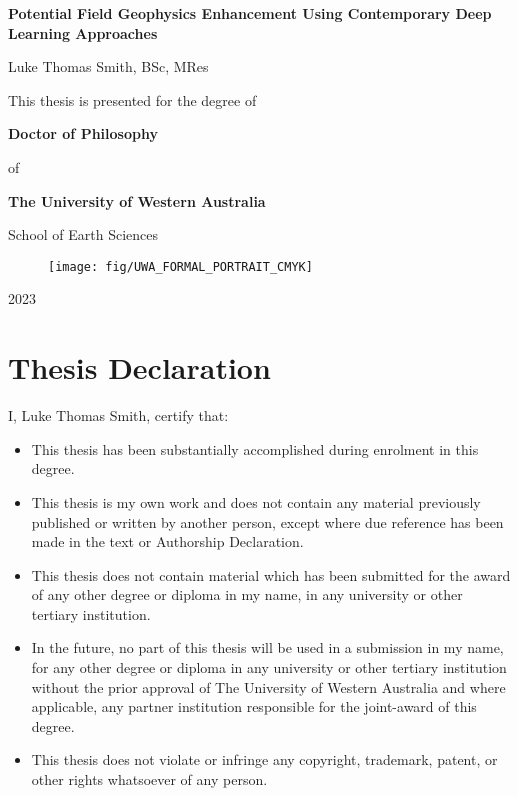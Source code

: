 \documentclass[12pt,a4paper]{report} %
\begin{document}
\begin{titlepage}

    \begin{center}
        \large{\textbf{Potential Field Geophysics Enhancement Using Contemporary Deep Learning Approaches}}

        \vspace{15 mm}
        {\large{Luke Thomas Smith, BSc, MRes}}

        \vspace{15 mm}
        This thesis is presented for the degree of

        \vspace{5 mm}
        \textbf{Doctor of Philosophy}

        of

        \textbf{The University of Western Australia}

        \vspace{5 mm}
        School of Earth Sciences

        \vspace{10 mm}
        \begin{figure}[h]
            \centering{}
            \texttt{[image: fig/UWA\_FORMAL\_PORTRAIT\_CMYK]}
        \end{figure}

        \vspace*{\fill}
        2023
    \end{center}
\end{titlepage}

\clearpage{}

\setcounter{page}{1}
\renewcommand{\thesection}{\Roman{section}}


\section{Thesis Declaration}
I, Luke Thomas Smith, certify that:
\begin{itemize}
    \item{}This thesis has been substantially accomplished during enrolment in this degree.
    \item{}This thesis is my own work and does not contain any material previously published or written by another person, except where due reference has been made in the text or Authorship Declaration.
    \item{}This thesis does not contain material which has been submitted for the award of any other degree or diploma in my name, in any university or other tertiary institution.
    \item{}In the future, no part of this thesis will be used in a submission in my name, for any other degree or diploma in any university or other tertiary institution without the prior approval of The University of Western Australia and where applicable, any partner institution responsible for the joint-award of this degree.
    \item{}This thesis does not violate or infringe any copyright, trademark, patent, or other rights whatsoever of any person.
\end{itemize}
\end{document}
